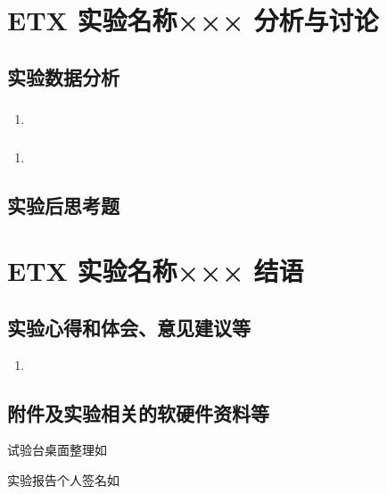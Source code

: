 \documentclass[dvipsnames, svgnames,a4paper,11pt]{article}
\begin{document}
	\section{ETX 实验名称××× \quad\heiti 分析与讨论}
	
	\subsection{实验数据分析}
	
	\subsubsection{}
	\begin{enumerate}
		\item 
	\end{enumerate}
	
	\subsubsection{}
	\begin{enumerate}
		\item 
	\end{enumerate}
	
	\subsubsection{}
	
	
	\subsection{实验后思考题}
	
	\begin{question}
		
	\end{question}
	
	\begin{question}
		
	\end{question}
	
	\begin{question}
		
	\end{question}
	
	
	
	\clearpage
	
	\section{ETX 实验名称××× \quad\heiti 结语}
	
	\subsection{实验心得和体会、意见建议等}
	\begin{enumerate}
		\item 
	\end{enumerate}
	

	\subsection{附件及实验相关的软硬件资料等}
	试验台桌面整理如%
	
	实验报告个人签名如

	
	
\end{document}
